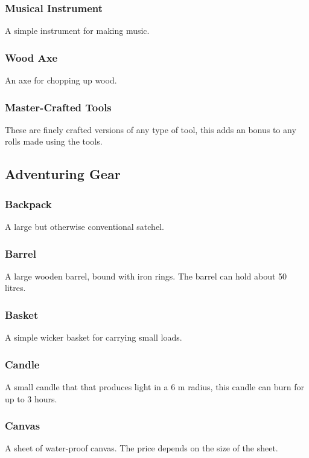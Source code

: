 \documentclass[a4paper,11pt,oneside]{book}
\newcommand{\textlf}[1]{\textbf{\titlecap{#1}}}
\begin{document}
\subsubsection*{Musical Instrument}
A simple instrument for making music.

\subsubsection*{Wood Axe}
An axe for chopping up wood.

\subsubsection*{Master-Crafted Tools}
These are finely crafted versions of any type of tool, this adds an \textlf{edge} bonus to any rolls made using the tools.

\subsection{Adventuring Gear}

\subsubsection*{Backpack}
A large but otherwise conventional satchel.

\subsubsection*{Barrel}
A large wooden barrel, bound with iron rings. The barrel can hold about 50 litres.

\subsubsection*{Basket}
A simple wicker basket for carrying small loads.

\subsubsection*{Candle}
A small candle that that produces \textlf{low} light in a 6 m radius, this candle can burn for up to 3 hours.

\subsubsection*{Canvas}
A sheet of water-proof canvas. The price depends on the size of the sheet.
\end{document}
